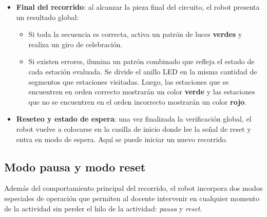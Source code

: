 \documentclass{prgrado}
\begin{document}
\begin{itemize}
    \item \textbf{Final del recorrido}: al alcanzar la pieza final del circuito, el robot presenta un resultado global:
    \begin{itemize}
        \item Si toda la secuencia es correcta, activa un patrón de luces \textbf{verdes} y realiza un giro de celebración.
        \item Si existen errores, ilumina un patrón combinado que refleja el estado de cada estación evaluada. Se divide el anillo LED en la misma cantidad de segmentos que estaciones visitadas. Luego, las estaciones que se encuentren en orden correcto mostrarán un color \textbf{verde} y las estaciones que no se encuentren en el orden incorrecto mostrarán un color \textbf{rojo}.
    \end{itemize}
    
    \item \textbf{Reseteo y estado de espera}: una vez finalizada la verificación global, el robot vuelve a colocarse en la casilla de inicio donde lee la señal de reset y entra en modo de espera. Aquí se puede iniciar un nuevo recorrido.
\end{itemize}

\subsection{Modo pausa y modo reset}

Además del comportamiento principal del recorrido, el robot incorpora dos modos especiales de operación que permiten al docente intervenir en cualquier momento de la actividad sin perder el hilo de la actividad: \emph{pausa} y \emph{reset}.
\end{document}
